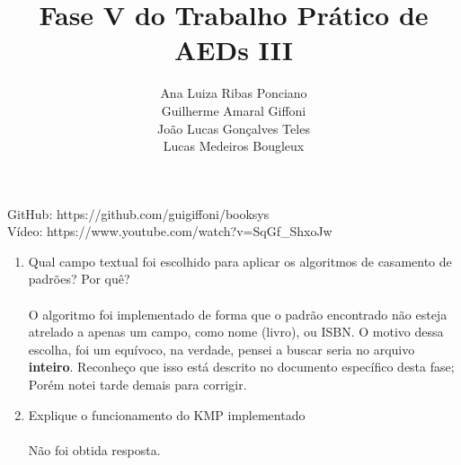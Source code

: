 \documentclass[12pt]{article}
\title{\textbf{Fase V do Trabalho Prático de AEDs III}}
\author{
    Ana Luiza Ribas Ponciano \\
    Guilherme Amaral Giffoni \\
    João Lucas Gonçalves Teles \\
    Lucas Medeiros Bougleux
}
\begin{document}
\maketitle

GitHub: https://github.com/guigiffoni/booksys \\
Vídeo: https://www.youtube.com/watch?v=SqGf\_ShxoJw

\begin{enumerate}
    \item Qual campo textual foi escolhido para aplicar os algoritmos de casamento de padrões? Por quê? \\\\
    O algoritmo foi implementado de forma que o padrão encontrado não esteja atrelado a apenas um campo, como nome (livro), ou ISBN. O motivo dessa escolha, foi um equívoco, na verdade, pensei a buscar seria no arquivo \textbf{inteiro}. Reconheço que isso está descrito no documento específico desta fase; Porém notei tarde demais para corrigir.

    \item Explique o funcionamento do KMP implementado \\\\
    Não foi obtida resposta.
    

\end{enumerate}
\end{document}
